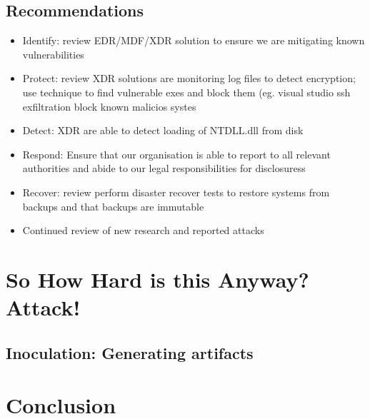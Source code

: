 \documentclass{article}
\begin{document}
\subsection{Recommendations}

\begin{itemize}
\item Identify: review EDR/MDF/XDR solution to ensure we are mitigating known vulnerabilities
\item Protect: review XDR solutions are monitoring log files to detect encryption; use technique to find vulnerable exes and block them (eg. visual studio ssh exfiltration block known malicios systes
\item Detect: XDR are able to detect loading of NTDLL.dll from disk
\item Respond: Ensure that our organisation is able to report to all relevant authorities  and abide to our legal responsibilities for disclosuress
\item Recover: review perform disaster recover tests to restore systems from backups and that backups are immutable 
\item Continued review of new research and reported attacks
\end{itemize}


\pagebreak
\section{So How Hard is this Anyway?  Attack!}

\subsection{Inoculation: Generating artifacts}



\pagebreak
\section{Conclusion}

\pagebreak
\printbibliography
\end{document}
